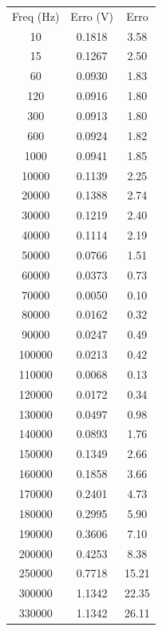 \documentclass[12pt,twoside, a4paper, twocolumn]{article}
\begin{document}
\begin{center}
    \begin{tabular}{ |c|c|c| }
        \hline
        Freq (Hz) & Erro (V) & Erro  \\
        10        & 0.1818   & 3.58  \\
        15        & 0.1267   & 2.50  \\
        60        & 0.0930   & 1.83  \\
        120       & 0.0916   & 1.80  \\
        300       & 0.0913   & 1.80  \\
        600       & 0.0924   & 1.82  \\
        1000      & 0.0941   & 1.85  \\
        10000     & 0.1139   & 2.25  \\
        20000     & 0.1388   & 2.74  \\
        30000     & 0.1219   & 2.40  \\
        40000     & 0.1114   & 2.19  \\
        50000     & 0.0766   & 1.51  \\
        60000     & 0.0373   & 0.73  \\
        70000     & 0.0050   & 0.10  \\
        80000     & 0.0162   & 0.32  \\
        90000     & 0.0247   & 0.49  \\
        100000    & 0.0213   & 0.42  \\
        110000    & 0.0068   & 0.13  \\
        120000    & 0.0172   & 0.34  \\
        130000    & 0.0497   & 0.98  \\
        140000    & 0.0893   & 1.76  \\
        150000    & 0.1349   & 2.66  \\
        160000    & 0.1858   & 3.66  \\
        170000    & 0.2401   & 4.73  \\
        180000    & 0.2995   & 5.90  \\
        190000    & 0.3606   & 7.10  \\
        200000    & 0.4253   & 8.38  \\
        250000    & 0.7718   & 15.21 \\
        300000    & 1.1342   & 22.35 \\
        330000    & 1.1342   & 26.11 \\
        \hline
    \end{tabular}
\end{center}
\end{document}
